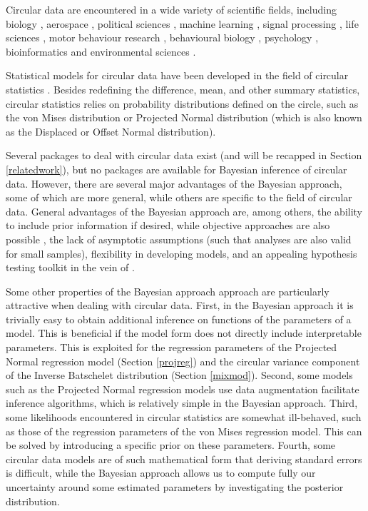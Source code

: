 Circular data are encountered in a wide variety of scientific fields,
including biology \citep{nunez2018bayesian}, aerospace
\citep{kurz2017deterministic}, political sciences \citep{gill2010},
machine learning \citep{gopal2014mises}, signal processing
\citep{traa2013wrapped}, life sciences \citep{mardianew}, motor
behaviour research
\citep{mechsner2001perceptual, mechsner2007bimanual, postma2008keep, baayen2012test},
behavioural biology \citep{bulbert2015danger}, psychology
\citep{Leary1957, gurtman2003circumplex, kaas2006haptic,  gurtman2009exploring},
bioinformatics \citep{mardia2008multivariate} and environmental sciences
\citep{lagona2016regression, lagona2015hidden, arnold2006recent}.

Statistical models for circular data have been developed in the field of
circular statistics
\citep{fisher1995statistical, jammalamadaka2001topics, mardia2009directional, pewsey2013circular, ley2017modern, ley2018applied}.
Besides redefining the difference, mean, and other summary statistics,
circular statistics relies on probability distributions defined on the
circle, such as the von Mises distribution \citep{von1918ganzzahligkeit}
or Projected Normal distribution \citep{Kendall1974} (which is also
known as the Displaced or Offset Normal distribution).

Several packages to deal with circular data exist (and will be recapped
in Section \ref{relatedwork}), but no packages are available for
Bayesian inference of circular data. However, there are several major
advantages of the Bayesian approach, some of which are more general,
while others are specific to the field of circular data. General
advantages of the Bayesian approach are, among others, the ability to
include prior information if desired, while objective approaches are
also possible \citep{berger2006case}, the lack of asymptotic assumptions
(such that analyses are also valid for small samples), flexibility in
developing models, and an appealing hypothesis testing toolkit in the
vein of \citet{jeffreys1961theory}.

Some other properties of the Bayesian approach approach are particularly
attractive when dealing with circular data. First, in the Bayesian
approach it is trivially easy to obtain additional inference on
functions of the parameters of a model. This is beneficial if the model
form does not directly include interpretable parameters. This is
exploited for the regression parameters of the Projected Normal
regression model (Section \ref{projreg}) and the circular variance
component of the Inverse Batschelet distribution (Section \ref{mixmod}).
Second, some models such as the Projected Normal regression models use
data augmentation facilitate inference algorithms, which is relatively
simple in the Bayesian approach. Third, some likelihoods encountered in
circular statistics are somewhat ill-behaved, such as those of the
regression parameters of the von Mises regression model. This can be
solved by introducing a specific prior on these parameters. Fourth, some
circular data models are of such mathematical form that deriving
standard errors is difficult, while the Bayesian approach allows us to
compute fully our uncertainty around some estimated parameters by
investigating the posterior distribution.

